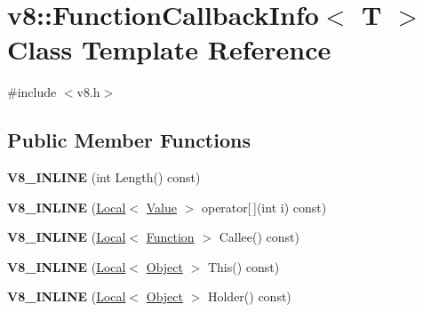 \hypertarget{classv8_1_1_function_callback_info}{}\section{v8\+:\+:Function\+Callback\+Info$<$ T $>$ Class Template Reference}
\label{classv8_1_1_function_callback_info}


{\ttfamily \#include $<$v8.\+h$>$}

\subsection*{Public Member Functions}
\begin{DoxyCompactItemize}
\item 
\hypertarget{classv8_1_1_function_callback_info_ace9a440a9de6e1874459d9ef7c87d5e4}{}{\bfseries V8\+\_\+\+I\+N\+L\+I\+N\+E} (int Length() const)\label{classv8_1_1_function_callback_info_ace9a440a9de6e1874459d9ef7c87d5e4}

\item 
\hypertarget{classv8_1_1_function_callback_info_ac9915a06ba8b6ed8467b324ab767a027}{}{\bfseries V8\+\_\+\+I\+N\+L\+I\+N\+E} (\hyperlink{classv8_1_1_local}{Local}$<$ \hyperlink{classv8_1_1_value}{Value} $>$ operator\mbox{[}$\,$\mbox{]}(int i) const)\label{classv8_1_1_function_callback_info_ac9915a06ba8b6ed8467b324ab767a027}

\item 
\hypertarget{classv8_1_1_function_callback_info_a619d843d2c11860d130fc31a5c286b08}{}{\bfseries V8\+\_\+\+I\+N\+L\+I\+N\+E} (\hyperlink{classv8_1_1_local}{Local}$<$ \hyperlink{classv8_1_1_function}{Function} $>$ Callee() const)\label{classv8_1_1_function_callback_info_a619d843d2c11860d130fc31a5c286b08}

\item 
\hypertarget{classv8_1_1_function_callback_info_acee42cba853c1533facc25ea814fa4e8}{}{\bfseries V8\+\_\+\+I\+N\+L\+I\+N\+E} (\hyperlink{classv8_1_1_local}{Local}$<$ \hyperlink{classv8_1_1_object}{Object} $>$ This() const)\label{classv8_1_1_function_callback_info_acee42cba853c1533facc25ea814fa4e8}

\item 
\hypertarget{classv8_1_1_function_callback_info_a48d3024fffcc54eba2ac3599db681c39}{}{\bfseries V8\+\_\+\+I\+N\+L\+I\+N\+E} (\hyperlink{classv8_1_1_local}{Local}$<$ \hyperlink{classv8_1_1_object}{Object} $>$ Holder() const)\label{classv8_1_1_function_callback_info_a48d3024fffcc54eba2ac3599db681c39}


\end{DoxyCompactItemize}
